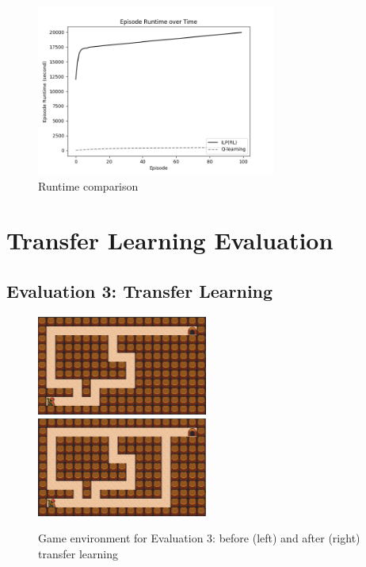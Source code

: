 \begin{figure}[!htb]
\centering
\includegraphics[width=0.7\textwidth]{./figures/experiment2_runtime}
\caption{Runtime comparison}
\label{experiment2_runtime}
\end{figure}

\section{Transfer Learning Evaluation}
\label{sec:transfer_learning_evaluation}

\subsection{Evaluation 3: Transfer Learning}
\label{subsec:experiement3_setup}

\begin{figure}[!htb]
\centerline{
\includegraphics[width=0.5\textwidth]{./figures/experiment3_before}
\includegraphics[width=0.5\textwidth]{./figures/experiment3_after}
}
\caption{Game environment for Evaluation 3: before (left) and after (right) transfer learning}
\label{experiment3_setup}
\end{figure}

